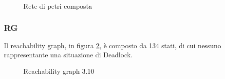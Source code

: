 \documentclass[a4paper]{article}
\begin{document}
\newpage
\begin{figure}[!ht]
\centering
{}
\caption{Rete di petri composta} \label{FIG:3.10PN}
\end{figure}
\newpage
\subsubsection{RG}
Il reachability graph, in figura \ref{FIG:3.10RG}, è composto da 134 stati, di cui nessuno rappresentante una situazione di Deadlock.
\begin{figure}[!ht]
\centering
{}
\caption{Reachability graph 3.10} \label{FIG:3.10RG}
\end{figure}
\newpage
\end{document}
